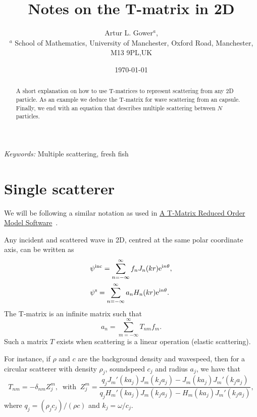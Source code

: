 \documentclass[ 12pt, a4paper]{article}
\begin{document}
\title{Notes on the T-matrix in 2D}
\author{
Artur L. Gower$^{a}$,\\
\footnotesize{$^{a}$ School of Mathematics, University of Manchester, Oxford Road, Manchester, M13 9PL,UK}
}
\date{\today}
\maketitle

\begin{abstract}
A short explanation on how to use T-matrices to represent scattering from any 2D particle. As an example we deduce the T-matrix for   wave scattering from an capsule. Finally, we end with an equation that describes multiple scattering between $N$ particles.
\end{abstract}

\noindent
{\textit{Keywords:} Multiple scattering, fresh fish}

\section{Single scatterer}

We will be following a similar notation as used in \href{a9-ganesh.pdf}{A T-Matrix Reduced Order
Model Software}~\parencite{ganesh_far-field_2010,ganesh_algorithm_2017}.

Any incident and scattered wave in 2D, centred at the same polar coordinate axis, can be written as
\begin{align}
  & \psi^{\mathrm{inc}} = \sum_{n=-\infty}^\infty f_n J_{n}(k r) \mathrm{e}^{\mathrm{i} n \theta},
  \\
  & \psi^{\mathrm{s}} = \sum_{n=-\infty}^\infty a_n H_{n}(k r) \mathrm{e}^{\mathrm{i} n \theta}.
\end{align}
The T-matrix is an infinite matrix such that
\begin{equation}
  a_n = \sum_{m=-\infty}^\infty T_{nm} f_m.
\end{equation}
Such a matrix $T$ exists when scattering is a linear operation (elastic scattering).

For instance, if $\rho$ and $c$ are the background density and wavespeed, then for a circular scatterer with density $\rho_j$, soundspeed $c_j$ and radius $a_j$, we have that
\begin{equation}
  T_{nm} = - \delta_{nm} Z^m_j, \;\; \text{with} \;\; Z^m_j = \frac{q_j J_m' (k a_j) J_m (k_j a_j) - J_m (k a_j) J_m' (k_j a_j) }{q_j H_m '(k a_j) J_m(k_j a_j) - H_m(k a_j) J_m '(k_j a_j)},
  \label{eqn:circular_t-matrix}
\end{equation}
where $q_j = (\rho_j c_j)/(\rho c)$ and $k_j = \omega/c_j$.
\end{document}
